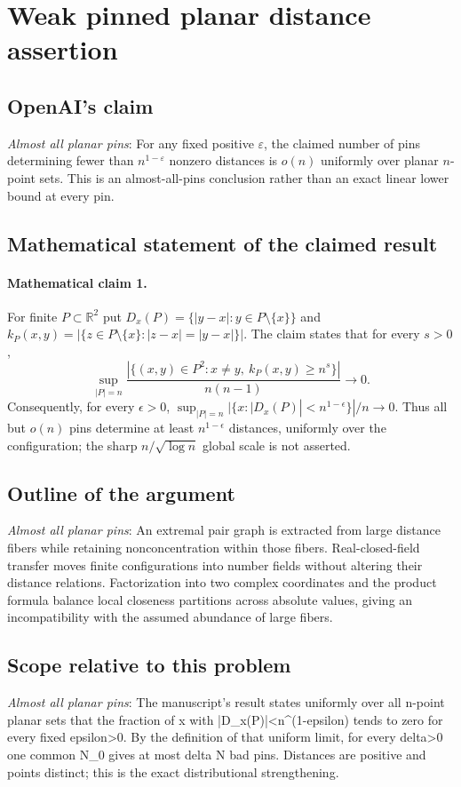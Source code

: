 \documentclass[11pt]{article}
\begin{document}
\section*{Weak pinned planar distance assertion}

\subsection{OpenAI's claim}
\textit{Almost all planar pins}: For any fixed positive $\varepsilon$, the claimed number of pins determining fewer than $n^{1-\varepsilon}$ nonzero distances is $o(n)$ uniformly over planar $n$-point sets. This is an almost-all-pins conclusion rather than an exact linear lower bound at every pin.

\subsection{Mathematical statement of the claimed result}
\paragraph{Mathematical claim 1.} For finite $P\subset\mathbb R^2$ put $D_x(P)=\{|y-x|:y\in P\setminus\{x\}\}$ and $k_P(x,y)=|\{z\in P\setminus\{x\}:|z-x|=|y-x|\}|$. The claim states that for every $s>0$, \[\sup_{|P|=n}\frac{|\{(x,y)\in P^2:x\ne y,\ k_P(x,y)\ge n^s\}|}{n(n-1)}\longrightarrow0.\] Consequently, for every $\epsilon>0$, $\sup_{|P|=n}|\{x:|D_x(P)|<n^{1-\epsilon}\}|/n\to0$. Thus all but $o(n)$ pins determine at least $n^{1-\epsilon}$ distances, uniformly over the configuration; the sharp $n/\sqrt{\log n}$ global scale is not asserted.

\subsection{Outline of the argument}
\textit{Almost all planar pins}: An extremal pair graph is extracted from large distance fibers while retaining nonconcentration within those fibers. Real-closed-field transfer moves finite configurations into number fields without altering their distance relations. Factorization into two complex coordinates and the product formula balance local closeness partitions across absolute values, giving an incompatibility with the assumed abundance of large fibers.

\subsection{Scope relative to this problem}
\textit{Almost all planar pins}: The manuscript’s result states uniformly over all n-point planar sets that the fraction of x with |D\_x(P)|<n\textasciicircum{}(1-epsilon) tends to zero for every fixed epsilon>0. By the definition of that uniform limit, for every delta>0 one common N\_0 gives at most delta N bad pins. Distances are positive and points distinct; this is the exact distributional strengthening.
\end{document}
